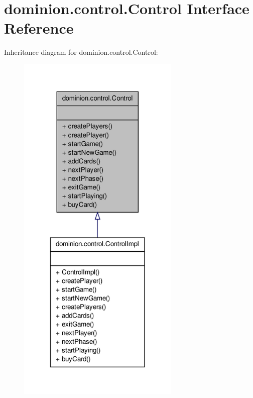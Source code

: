 \hypertarget{interfacedominion_1_1control_1_1Control}{\section{dominion.\-control.\-Control \-Interface \-Reference}
\label{interfacedominion_1_1control_1_1Control}
}


\-Inheritance diagram for dominion.\-control.\-Control\-:
\nopagebreak
\begin{figure}[H]
\begin{center}
\leavevmode
\includegraphics[width=220pt]{interfacedominion_1_1control_1_1Control__inherit__graph}
\end{center}
\end{figure}
